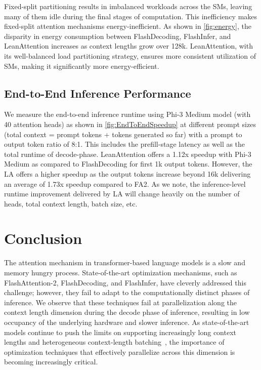 {{{{Fixed-split partitioning results in imbalanced workloads across the SMs, leaving many of them idle during the final stages of computation. This inefficiency makes fixed-split attention mechanisms energy-inefficient. As shown in \autoref{fig:energy}, the disparity in energy consumption between FlashDecoding, FlashInfer, and LeanAttention increases as context lengths grow over 128k. LeanAttention, with its well-balanced load partitioning strategy, ensures more consistent utilization of SMs, making it significantly more energy-efficient.

\subsection{End-to-End Inference Performance}
\label{subsec:inferperf}
We measure the end-to-end inference runtime using Phi-3  Medium model (with 40 attention heads) as shown in \autoref{fig:EndToEndSpeedup} at different prompt sizes (total context = prompt tokens + tokens generated so far) with a prompt to output token ratio of 8:1. This includes the prefill-stage latency as well as the total runtime of decode-phase. LeanAttention offers a 1.12x speedup with Phi-3 Medium as compared to FlashDecoding for first 1k output tokens. However, the LA offers a higher speedup as the output tokens increase beyond 16k delivering an average of 1.73x speedup compared to FA2. As we note, the inference-level runtime improvement delivered by LA will change heavily on the number of heads, total context length, batch size, etc.

\section{Conclusion}
The attention mechanism in transformer-based language models is a slow and memory hungry process. State-of-the-art optimization mechanisms, such as FlashAttention-2, FlashDecoding, and FlashInfer, have cleverly addressed this challenge; however, they fail to adapt to the computationally distinct phases of inference. We observe that these techniques fail at parallelization along the context length dimension during the decode phase of inference, resulting in low occupancy of the underlying hardware and slower inference. As state-of-the-art models continue to push the limits on supporting increasingly long context lengths and heterogeneous context-length batching~\cite{sarathi}, the importance of optimization techniques that effectively parallelize across this dimension is becoming increasingly critical.

}}}}
